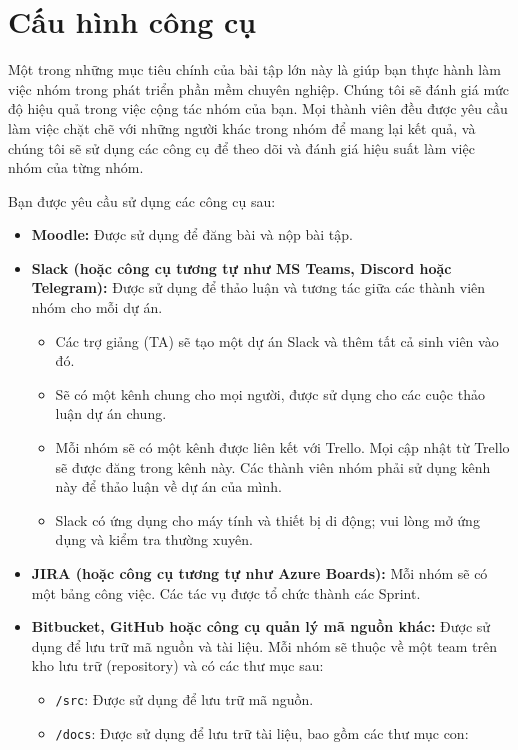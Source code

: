 \section{Cấu hình công cụ}

Một trong những mục tiêu chính của bài tập lớn này là giúp bạn thực hành làm việc nhóm trong phát triển phần mềm chuyên nghiệp. Chúng tôi sẽ đánh giá mức độ hiệu quả trong việc cộng tác nhóm của bạn. Mọi thành viên đều được yêu cầu làm việc chặt chẽ với những người khác trong nhóm để mang lại kết quả, và chúng tôi sẽ sử dụng các công cụ để theo dõi và đánh giá hiệu suất làm việc nhóm của từng nhóm.

Bạn được yêu cầu sử dụng các công cụ sau:

\begin{itemize}
    \item \textbf{Moodle:} Được sử dụng để đăng bài và nộp bài tập.
    \item \textbf{Slack (hoặc công cụ tương tự như MS Teams, Discord hoặc Telegram):} Được sử dụng để thảo luận và tương tác giữa các thành viên nhóm cho mỗi dự án.
    \begin{itemize}
        \item Các trợ giảng (TA) sẽ tạo một dự án Slack và thêm tất cả sinh viên vào đó.
        \item Sẽ có một kênh chung cho mọi người, được sử dụng cho các cuộc thảo luận dự án chung.
        \item Mỗi nhóm sẽ có một kênh được liên kết với Trello. Mọi cập nhật từ Trello sẽ được đăng trong kênh này. Các thành viên nhóm phải sử dụng kênh này để thảo luận về dự án của mình.
        \item Slack có ứng dụng cho máy tính và thiết bị di động; vui lòng mở ứng dụng và kiểm tra thường xuyên.
    \end{itemize}
    \item \textbf{JIRA (hoặc công cụ tương tự như Azure Boards):} Mỗi nhóm sẽ có một bảng công việc. Các tác vụ được tổ chức thành các Sprint.
    \item \textbf{Bitbucket, GitHub hoặc công cụ quản lý mã nguồn khác:} Được sử dụng để lưu trữ mã nguồn và tài liệu. Mỗi nhóm sẽ thuộc về một team trên kho lưu trữ (repository) và có các thư mục sau:
    \begin{itemize}
        \item \texttt{/src}: Được sử dụng để lưu trữ mã nguồn.
        \item \texttt{/docs}: Được sử dụng để lưu trữ tài liệu, bao gồm các thư mục con:

\end{itemize}
\end{itemize}
